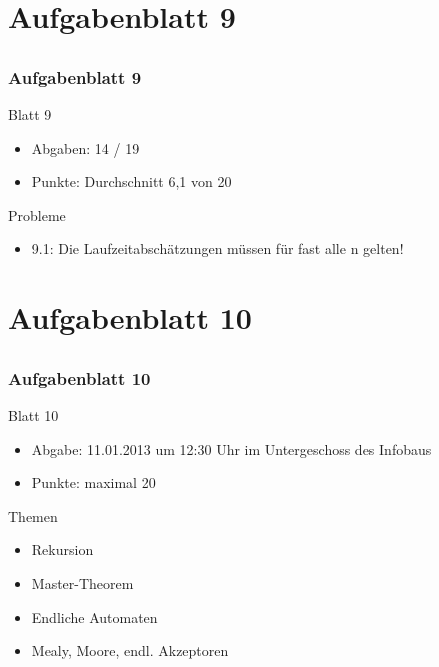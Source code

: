 
\section[Rückblick Üb 9]{Aufgabenblatt 9}
\subsection*{}
\begin{frame}
	\frametitle{Aufgabenblatt 9}
	\begin{block}{Blatt 9}
		\begin{itemize}
			\item Abgaben: 14 / 19
			\item Punkte: Durchschnitt 6,1 von 20
		\end{itemize}
   \end{block}
	\begin{block}{Probleme}
 		\begin{itemize}
           \item 9.1: Die Laufzeitabschätzungen müssen für fast alle n gelten!
 	  \end{itemize}
	\end{block}
\end{frame}

\section[Blatt 10]{Aufgabenblatt 10}
\subsection*{}
\begin{frame}
	\frametitle{Aufgabenblatt 10}
	\begin{block}{Blatt 10}
		\begin{itemize}
			\item Abgabe: 11.01.2013 um 12:30 Uhr im Untergeschoss des Infobaus
			\item Punkte: maximal 20
		\end{itemize}
  	\end{block}
	\begin{block}{Themen}
		\begin{itemize}
        \item Rekursion
        \item Master-Theorem
	  		\item Endliche Automaten
	  		\item Mealy, Moore, endl. Akzeptoren
	 	\end{itemize}
	\end{block}
\end{frame}
